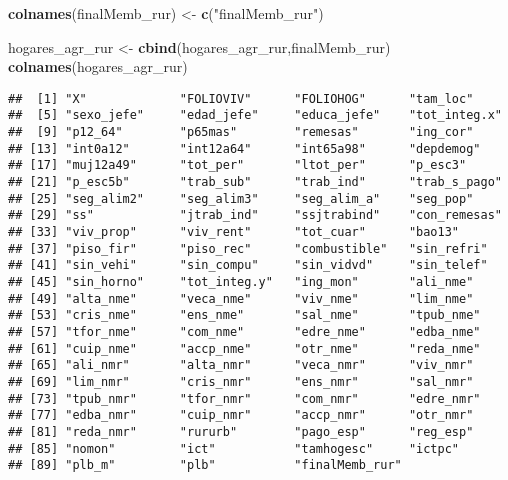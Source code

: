 \documentclass[11pt,]{article}
\newenvironment{Shaded}{\begin{snugshade}}{\end{snugshade}}
\newcommand{\KeywordTok}[1]{\textcolor[rgb]{0.13,0.29,0.53}{\textbf{#1}}}
\newcommand{\DecValTok}[1]{\textcolor[rgb]{0.00,0.00,0.81}{#1}}
\newcommand{\StringTok}[1]{\textcolor[rgb]{0.31,0.60,0.02}{#1}}
\newcommand{\OperatorTok}[1]{\textcolor[rgb]{0.81,0.36,0.00}{\textbf{#1}}}
\newcommand{\NormalTok}[1]{#1}
\begin{document}
\begin{Shaded}
\begin{Highlighting}[]
\KeywordTok{colnames}\NormalTok{(finalMemb_rur) <-}\StringTok{ }\KeywordTok{c}\NormalTok{(}\StringTok{"finalMemb_rur"}\NormalTok{) }

\NormalTok{hogares_agr_rur <-}\StringTok{ }\KeywordTok{cbind}\NormalTok{(hogares_agr_rur,finalMemb_rur)}
\KeywordTok{colnames}\NormalTok{(hogares_agr_rur)  }
\end{Highlighting}
\end{Shaded}

\begin{verbatim}
##  [1] "X"             "FOLIOVIV"      "FOLIOHOG"      "tam_loc"      
##  [5] "sexo_jefe"     "edad_jefe"     "educa_jefe"    "tot_integ.x"  
##  [9] "p12_64"        "p65mas"        "remesas"       "ing_cor"      
## [13] "int0a12"       "int12a64"      "int65a98"      "depdemog"     
## [17] "muj12a49"      "tot_per"       "ltot_per"      "p_esc3"       
## [21] "p_esc5b"       "trab_sub"      "trab_ind"      "trab_s_pago"  
## [25] "seg_alim2"     "seg_alim3"     "seg_alim_a"    "seg_pop"      
## [29] "ss"            "jtrab_ind"     "ssjtrabind"    "con_remesas"  
## [33] "viv_prop"      "viv_rent"      "tot_cuar"      "bao13"        
## [37] "piso_fir"      "piso_rec"      "combustible"   "sin_refri"    
## [41] "sin_vehi"      "sin_compu"     "sin_vidvd"     "sin_telef"    
## [45] "sin_horno"     "tot_integ.y"   "ing_mon"       "ali_nme"      
## [49] "alta_nme"      "veca_nme"      "viv_nme"       "lim_nme"      
## [53] "cris_nme"      "ens_nme"       "sal_nme"       "tpub_nme"     
## [57] "tfor_nme"      "com_nme"       "edre_nme"      "edba_nme"     
## [61] "cuip_nme"      "accp_nme"      "otr_nme"       "reda_nme"     
## [65] "ali_nmr"       "alta_nmr"      "veca_nmr"      "viv_nmr"      
## [69] "lim_nmr"       "cris_nmr"      "ens_nmr"       "sal_nmr"      
## [73] "tpub_nmr"      "tfor_nmr"      "com_nmr"       "edre_nmr"     
## [77] "edba_nmr"      "cuip_nmr"      "accp_nmr"      "otr_nmr"      
## [81] "reda_nmr"      "rururb"        "pago_esp"      "reg_esp"      
## [85] "nomon"         "ict"           "tamhogesc"     "ictpc"        
## [89] "plb_m"         "plb"           "finalMemb_rur"
\end{verbatim}

\begin{Shaded}
\end{Shaded}
\end{document}
